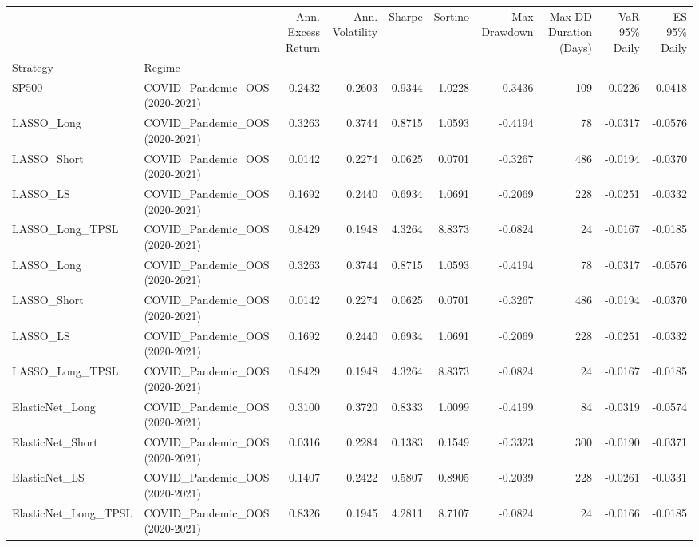 \begin{tabular}{llrrrrrrrr}
\toprule
 &  & Ann. Excess Return & Ann. Volatility & Sharpe & Sortino & Max Drawdown & Max DD Duration (Days) & VaR 95\% Daily & ES 95\% Daily \\
Strategy & Regime &  &  &  &  &  &  &  &  \\
\midrule
SP500 & COVID\_Pandemic\_OOS (2020-2021) & 0.2432 & 0.2603 & 0.9344 & 1.0228 & -0.3436 & 109 & -0.0226 & -0.0418 \\
\cline{1-10}
LASSO\_Long & COVID\_Pandemic\_OOS (2020-2021) & 0.3263 & 0.3744 & 0.8715 & 1.0593 & -0.4194 & 78 & -0.0317 & -0.0576 \\
\cline{1-10}
LASSO\_Short & COVID\_Pandemic\_OOS (2020-2021) & 0.0142 & 0.2274 & 0.0625 & 0.0701 & -0.3267 & 486 & -0.0194 & -0.0370 \\
\cline{1-10}
LASSO\_LS & COVID\_Pandemic\_OOS (2020-2021) & 0.1692 & 0.2440 & 0.6934 & 1.0691 & -0.2069 & 228 & -0.0251 & -0.0332 \\
\cline{1-10}
LASSO\_Long\_TPSL & COVID\_Pandemic\_OOS (2020-2021) & 0.8429 & 0.1948 & 4.3264 & 8.8373 & -0.0824 & 24 & -0.0167 & -0.0185 \\
\cline{1-10}
LASSO\_Long & COVID\_Pandemic\_OOS (2020-2021) & 0.3263 & 0.3744 & 0.8715 & 1.0593 & -0.4194 & 78 & -0.0317 & -0.0576 \\
\cline{1-10}
LASSO\_Short & COVID\_Pandemic\_OOS (2020-2021) & 0.0142 & 0.2274 & 0.0625 & 0.0701 & -0.3267 & 486 & -0.0194 & -0.0370 \\
\cline{1-10}
LASSO\_LS & COVID\_Pandemic\_OOS (2020-2021) & 0.1692 & 0.2440 & 0.6934 & 1.0691 & -0.2069 & 228 & -0.0251 & -0.0332 \\
\cline{1-10}
LASSO\_Long\_TPSL & COVID\_Pandemic\_OOS (2020-2021) & 0.8429 & 0.1948 & 4.3264 & 8.8373 & -0.0824 & 24 & -0.0167 & -0.0185 \\
\cline{1-10}
ElasticNet\_Long & COVID\_Pandemic\_OOS (2020-2021) & 0.3100 & 0.3720 & 0.8333 & 1.0099 & -0.4199 & 84 & -0.0319 & -0.0574 \\
\cline{1-10}
ElasticNet\_Short & COVID\_Pandemic\_OOS (2020-2021) & 0.0316 & 0.2284 & 0.1383 & 0.1549 & -0.3323 & 300 & -0.0190 & -0.0371 \\
\cline{1-10}
ElasticNet\_LS & COVID\_Pandemic\_OOS (2020-2021) & 0.1407 & 0.2422 & 0.5807 & 0.8905 & -0.2039 & 228 & -0.0261 & -0.0331 \\
\cline{1-10}
ElasticNet\_Long\_TPSL & COVID\_Pandemic\_OOS (2020-2021) & 0.8326 & 0.1945 & 4.2811 & 8.7107 & -0.0824 & 24 & -0.0166 & -0.0185 \\

\end{tabular}
